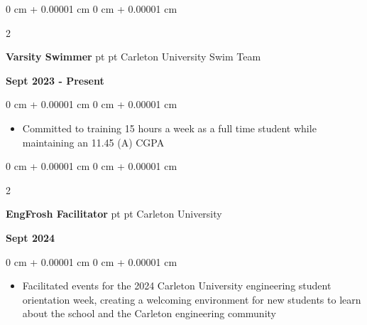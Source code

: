 \documentclass[10pt, letterpaper]{article}
\newenvironment{highlights}{
    \begin{itemize}[
        topsep=0.10 cm,
        parsep=0.10 cm,
        partopsep=0pt,
        itemsep=0pt,
        leftmargin=0 cm + 10pt
    ]
}{
    \end{itemize}
} %
\newenvironment{onecolentry}{
    \begin{adjustwidth}{
        0 cm + 0.00001 cm
    }{
        0 cm + 0.00001 cm
    }
}{
    \end{adjustwidth}
} %
\newenvironment{twocolentry}[2][]{
    \onecolentry
    \def\secondColumn{#2}
    \setcolumnwidth{\fill, 4.5 cm}
    \begin{paracol}{2}
}{
    \switchcolumn \raggedleft \secondColumn
    \end{paracol}
    \endonecolentry
} %
\begin{document}
        
        \begin{samepage}
            \begin{twocolentry}{
                \textbf{Sept 2023 - Present}
}
                \textbf{Varsity Swimmer} pt\AND {} pt Carleton University Swim Team
                \end{twocolentry}

            \vspace{0.10 cm}
            
            \begin{onecolentry}
                \begin{highlights}
                \item Committed to training 15 hours a week as a full time student while maintaining an 11.45 (A) CGPA
                
                
                        \end{highlights}
            \vspace{0.2 cm}
            
        \end{onecolentry}
        \begin{twocolentry}{
                \textbf{Sept 2024}
}
                \textbf{EngFrosh Facilitator} pt\AND {} pt Carleton University 
                \end{twocolentry}

            \vspace{0.10 cm}
            
            \begin{onecolentry}
                \begin{highlights}
                \item Facilitated events for the 2024 Carleton University engineering student orientation week, creating a welcoming environment for new students to learn about the school and the Carleton engineering community 
                
                        \end{highlights}
            
        \end{onecolentry}
        \end{samepage}


    
    





    
\end{document}
